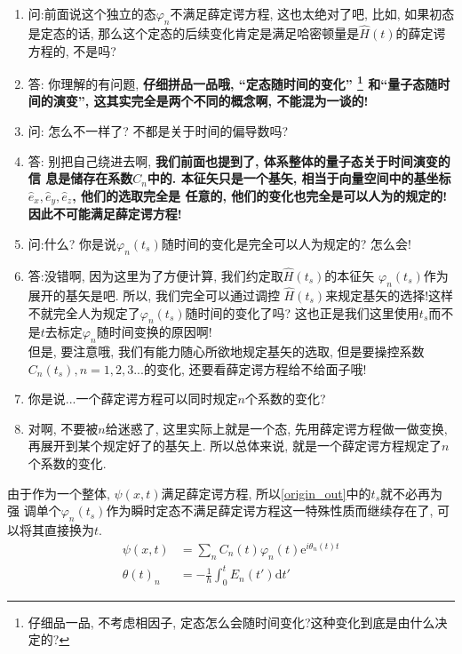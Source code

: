 \documentclass[a4paper, 11pt]{article}
\begin{document}
\begin{spacing}{1.2}
        \begin{enumerate}[*]
          \item 问:前面说这个独立的态$\varphi_n$不满足薛定谔方程, 这也太绝对了吧, 比如, 如果初态是定态的话,
          那么这个定态的后续变化肯定是满足哈密顿量是$\hat{H}(t)$的薛定谔方程的, 不是吗?
          \item 答: 你理解的有问题, \textbf{仔细拼品一品哦, ``定态随时间的变化''
          \footnote{仔细品一品, 不考虑相因子, 定态怎么会随时间变化?这种变化到底是由什么决定的?}
          和``量子态随时间的演变'', 这其实完全是两个不同的概念啊, 不能混为一谈的!}
          \item 问: 怎么不一样了? 不都是关于时间的偏导数吗?
          \item 答: 别把自己绕进去啊, \textbf{我们前面也提到了, 体系整体的量子态关于时间演变的信
          息是储存在系数$C_n$中的. 本征矢只是一个基矢, 
          相当于向量空间中的基坐标$\hat{e}_x, \hat{e}_y, \hat{e}_z$, 他们的选取完全是
          任意的, 他们的变化也完全是可以人为的规定的!因此不可能满足薛定谔方程!}
          \item 问:什么? 你是说$\varphi_n(t_s)$随时间的变化是完全可以人为规定的? 怎么会!
          \item 答:没错啊, 因为这里为了方便计算, 我们约定取$\hat{H}(t_s)$的本征矢
          $\varphi_n(t_s)$作为展开的基矢是吧. 所以, 我们完全可以通过调控
          $\hat{H}(t_s)$来规定基矢的选择!这样不就完全人为规定了$\varphi_n(t_s)$随时间的变化了吗?
          这也正是我们这里使用$t_s$而不是$t$去标定$\varphi_n$随时间变换的原因啊!\\
          但是, 要注意哦, 我们有能力随心所欲地规定基矢的选取, 但是要操控系数$C_n(t_s), n=1,2,3...$的变化,
          还要看薛定谔方程给不给面子哦!
          \item 你是说...一个薛定谔方程可以同时规定$n$个系数的变化?
          \item 对啊, 不要被$n$给迷惑了, 这里实际上就是一个态, 先用薛定谔方程做一做变换, 
          再展开到某个规定好了的基矢上. 所以总体来说, 就是一个薛定谔方程规定了$n$个系数的变化. 
        \end{enumerate}
        \par
        由于作为一个整体, $\psi(x, t)$满足薛定谔方程, 所以\eqref{origin_out}中的$t_s$就不必再为强
        调单个$\varphi_n(t_s)$作为瞬时定态不满足薛定谔方程这一特殊性质而继续存在了, 可以将其直接换为$t$.
        \begin{equation} 
          \begin{aligned}
            \psi(x, t) &= \sum_nC_n(t)\varphi_n(t)\mathrm{e}^{i\theta_n(t)t}\\
            \theta(t)_n &= -\frac{1}{\hbar}\int_0^{t}E_n(t')\mathrm{d}t'
          \end{aligned}
        \end{equation}
        

\end{spacing}
\end{document}
